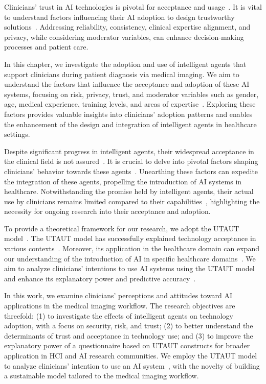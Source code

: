 Clinicians' trust in \ac{AI} technologies is pivotal for acceptance and usage~\cite{CALISTO2021102607}.
It is vital to understand factors influencing their \ac{AI} adoption to design trustworthy solutions~\cite{JUNGMANN2021834}.
Addressing reliability, consistency, clinical expertise alignment, and privacy, while considering moderator variables, can enhance decision-making processes and patient care.

In this chapter, we investigate the adoption and use of intelligent agents that support clinicians during patient diagnosis via medical imaging.
We aim to understand the factors that influence the acceptance and adoption of these \ac{AI} systems, focusing on risk, privacy, trust, and moderator variables such as gender, age, medical experience, training levels, and areas of expertise~\cite{CALISTO2021102607, Kocielnik:2019:YAI:3290605.3300641}.
Exploring these factors provides valuable insights into clinicians' adoption patterns and enables the enhancement of the design and integration of intelligent agents in healthcare settings.

Despite significant progress in intelligent agents, their widespread acceptance in the clinical field is not assured~\cite{Kocielnik:2019:YAI:3290605.3300641}.
It is crucial to delve into pivotal factors shaping clinicians' behavior towards these agents~\cite{DEANGELI2020102412}.
Unearthing these factors can expedite the integration of these agents, propelling the introduction of \ac{AI} systems in healthcare.
Notwithstanding the promise held by intelligent agents, their actual use by clinicians remains limited compared to their capabilities~\cite{doi:10.1148/radiol.2020201874, doi:10.1148/radiol.2020190283}, highlighting the necessity for ongoing research into their acceptance and adoption.

To provide a theoretical framework for our research, we adopt the \ac{UTAUT} model~\cite{CALISTO2022102922, info:doi/10.2196/27122}.
The \ac{UTAUT} model has successfully explained technology acceptance in various contexts~\cite{DEANGELI2020102412}.
Moreover, its application in the healthcare domain can expand our understanding of the introduction of \ac{AI} in specific healthcare domains~\cite{info:doi/10.2196/27122}.
We aim to analyze clinicians' intentions to use \ac{AI} systems using the \ac{UTAUT} model and enhance its explanatory power and predictive accuracy~\cite{DEANGELI2020102412}.

In this work, we examine clinicians' perceptions and attitudes toward \ac{AI} applications in the medical imaging workflow.
The research objectives are threefold:
(1) to investigate the effects of intelligent agents on technology adoption, with a focus on security, risk, and trust;
(2) to better understand the determinants of trust and acceptance in technology use; and
(3) to improve the explanatory power of a questionnaire based on \ac{UTAUT} constructs for broader application in \ac{HCI} and \ac{AI} research communities.
We employ the \ac{UTAUT} model to analyze clinicians' intention to use an \ac{AI} system~\cite{DEANGELI2020102412}, with the novelty of building a sustainable model tailored to the medical imaging workflow.

